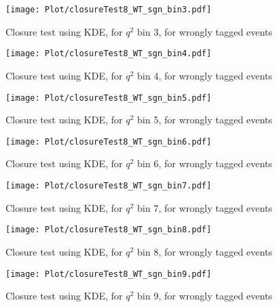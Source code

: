 \begin{figure}[hbt]
    \texttt{[image: Plot/closureTest8\_WT\_sgn\_bin3.pdf]}

    \caption{Closure test using KDE, for $q^2$ bin 3, for wrongly tagged events}
    \label{fig:clKDE3wt}
\end{figure}

\begin{figure}[hbt]
    \texttt{[image: Plot/closureTest8\_WT\_sgn\_bin4.pdf]}

    \caption{Closure test using KDE, for $q^2$ bin 4, for wrongly tagged events}
    \label{fig:clKDE4wt}
\end{figure}

\begin{figure}[hbt]
    \texttt{[image: Plot/closureTest8\_WT\_sgn\_bin5.pdf]}

    \caption{Closure test using KDE, for $q^2$ bin 5, for wrongly tagged events}
    \label{fig:clKDE5wt}
\end{figure}

\begin{figure}[hbt]
    \texttt{[image: Plot/closureTest8\_WT\_sgn\_bin6.pdf]}

    \caption{Closure test using KDE, for $q^2$ bin 6, for wrongly tagged events}
    \label{fig:clKDE6wt}
\end{figure}


\begin{figure}[hbt]
    \texttt{[image: Plot/closureTest8\_WT\_sgn\_bin7.pdf]}

    \caption{Closure test using KDE, for $q^2$ bin 7, for wrongly tagged events}
    \label{fig:clKDE7wt}
\end{figure}

\begin{figure}[hbt]
    \texttt{[image: Plot/closureTest8\_WT\_sgn\_bin8.pdf]}

    \caption{Closure test using KDE, for $q^2$ bin 8, for wrongly tagged events}
    \label{fig:clKDE8wt}
\end{figure}

\begin{figure}[hbt]
    \texttt{[image: Plot/closureTest8\_WT\_sgn\_bin9.pdf]}

    \caption{Closure test using KDE, for $q^2$ bin 9, for wrongly tagged events}
    \label{fig:clKDE9wt}
\end{figure}

